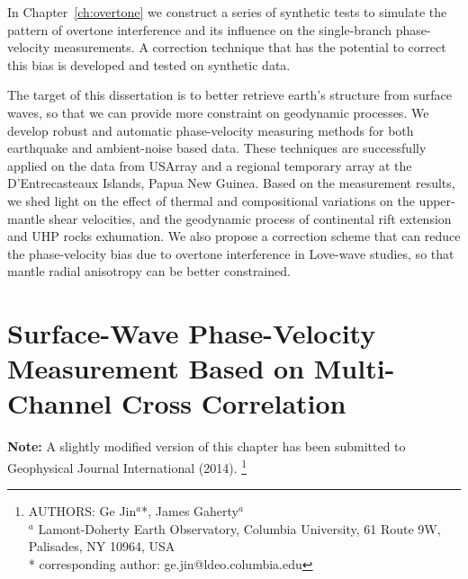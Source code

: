 \documentclass[12pt,oneside]{book}
\begin{document}
In Chapter~\ref{ch:overtone} we construct a series of synthetic tests to simulate the pattern of overtone interference and its influence on the single-branch phase-velocity measurements. A correction technique that has the potential to correct this bias is developed and tested on synthetic data.

The target of this dissertation is to better retrieve earth's structure from surface waves, so that we can provide more constraint on geodynamic processes. 
We develop robust and automatic phase-velocity measuring methods for both earthquake and ambient\nobreakdash-noise based data. These techniques are successfully applied on the data from USArray and a regional temporary array at the D'Entrecasteaux Islands, Papua New Guinea. 
Based on the measurement results, we shed light on the effect of thermal and compositional variations on the upper-mantle shear velocities, and the geodynamic process of continental rift extension and UHP rocks exhumation.
We also propose a correction scheme that can reduce the phase-velocity bias due to overtone interference in Love-wave studies, so that mantle radial anisotropy can be better constrained.

\raggedbottom
\pagebreak

\singlespacing
\chapter[Surface-Wave Measurement Based on Cross Correlation]{Surface-Wave Phase-Velocity Measurement Based on Multi-Channel Cross Correlation}
\label{ch:aswms}
\doublespacing

\thispagestyle{fancy}

\begin{raggedright}
{\bf Note: } A slightly modified version of this chapter has been submitted to Geophysical Journal International (2014).
\footnote{AUTHORS:  Ge Jin$^a$*,  James Gaherty$^a$\\
$^a$ Lamont-Doherty Earth Observatory, Columbia University, 61 Route 9W, Palisades, NY 10964, USA\\
* corresponding author: ge.jin@ldeo.columbia.edu}
\end{raggedright}
\normalsize


\end{document}
